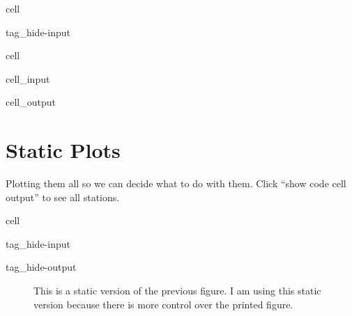 \documentclass[letterpaper,10pt,english]{jupyterBook}
\begin{document}
\begin{sphinxuseclass}{cell}
\begin{sphinxuseclass}{tag_hide-input}
\end{sphinxuseclass}
\end{sphinxuseclass}
\begin{sphinxuseclass}{cell}\begin{sphinxVerbatimInput}

\begin{sphinxuseclass}{cell_input}
\begin{sphinxVerbatim}[commandchars=\\\{\}]
          
         
\end{sphinxVerbatim}

\end{sphinxuseclass}\end{sphinxVerbatimInput}
\begin{sphinxVerbatimOutput}

\begin{sphinxuseclass}{cell_output}
\end{sphinxuseclass}\end{sphinxVerbatimOutput}

\end{sphinxuseclass}

\section{Static Plots}
\label{\detokenize{notebooks/regional_and_local/SL_Rankings_annual:static-plots}}
\sphinxAtStartPar
Plotting them all so we can decide what to do with them. Click “show code cell output” to see all stations.

\begin{sphinxuseclass}{cell}
\begin{sphinxuseclass}{tag_hide-input}
\begin{sphinxuseclass}{tag_hide-output}
\end{sphinxuseclass}
\end{sphinxuseclass}
\end{sphinxuseclass}
\begin{figure}[htbp]
\centering
\capstart

\noindent{}
\caption{This is a static version of the previous figure. I am using this static version because there is more control over the printed figure.}\label{\detokenize{notebooks/regional_and_local/SL_Rankings_annual:sl-rankings}}\end{figure}
\end{document}
